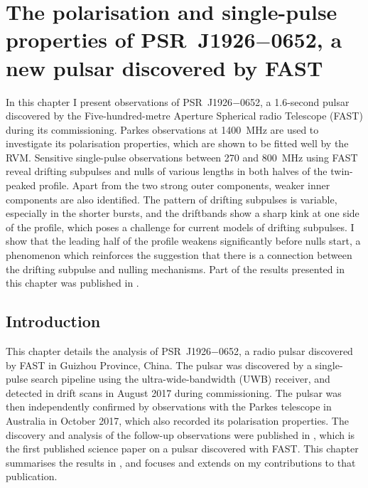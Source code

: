\chapter[The polarisation and single-pulse properties of \texorpdfstring{PSR~J1926$-$0652}{PSR~J1926--0652}]{The polarisation and single-pulse properties of \texorpdfstring{PSR~J1926$-$0652}{PSR~J1926--0652}, a new pulsar discovered by FAST}
\label{chapt: J1926}

In this chapter I present observations of PSR~J1926$-$0652, a 1.6-second pulsar discovered by the Five-hundred-metre Aperture Spherical radio Telescope (FAST) during its commissioning. Parkes observations at 1400~MHz are used to investigate its polarisation properties, which are shown to be fitted well by the RVM. Sensitive single-pulse observations between 270 and 800~MHz using FAST reveal drifting subpulses and nulls of various lengths in both halves of the twin-peaked profile. Apart from the two strong outer components, weaker inner components are also identified.  The pattern of drifting subpulses is variable, especially in the shorter bursts, and the driftbands show a sharp kink at one side of the profile, which poses a challenge for current models of drifting subpulses. I show that the leading half of the profile weakens significantly before nulls start, a phenomenon which reinforces the suggestion that there is a connection between the drifting subpulse and nulling mechanisms. Part of the results presented in this chapter was published in \citet{ZLH+2019}.

\section{Introduction}
\label{sec: J1926 - intro}

This chapter details the analysis of PSR~J1926$-$0652, a radio pulsar discovered by FAST in Guizhou Province, China. The pulsar was discovered by a single-pulse search pipeline \citep{ZBM+2014} using the ultra-wide-bandwidth (UWB) receiver, and detected in drift scans in August 2017 during commissioning. The pulsar was then independently confirmed by observations with the Parkes telescope in Australia in October 2017, which also recorded its polarisation properties. The discovery and analysis of the follow-up observations were published in \citet{ZLH+2019}, which is the first published science paper on a pulsar discovered with FAST. This chapter summarises the results in \citet{ZLH+2019}, and focuses and extends on my contributions to that publication.


